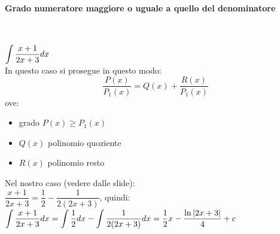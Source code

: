 \documentclass[12pt]{report}
\begin{document}
		\paragraph{Grado numeratore maggiore o uguale a quello del denominatore} \quad \\
		\begin{example}{}{}
			$\mathlarger{\int \frac{x+1}{2x+3}dx}$ \\
			In questo caso si prosegue in questo modo:
			\[
			\frac{P(x)}{P_1(x)} = Q(x) + \frac{R(x)}{P_1(x)}
			\]
			ove:
			\begin{itemize}
				\item grado $P(x) \geq P_1(x)$
				\item $Q(x)$ polinomio quoziente
				\item $R(x)$ polinomio resto
			\end{itemize}
			Nel nostro caso (vedere dalle slide): \\
			$\dfrac{x+1}{2x+3} = \dfrac{1}{2} - \dfrac{1}{2(2x + 3)}$, quindi: \\
			$\mathlarger{\int \frac{x+1}{2x+3}dx = \int\frac{1}{2}dx - \int\frac{1}{2(2x + 3)}dx = \frac{1}{2}x - \frac{\ln|2x + 3|}{4} + c} $
		\end{example}
\end{document}
